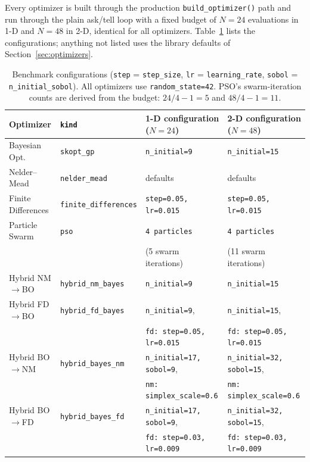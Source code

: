 Every optimizer is built through the production \texttt{build\_optimizer()}
path and run through the plain ask/tell loop with a fixed budget of
$N = 24$ evaluations in 1-D and $N = 48$ in 2-D, identical for all
optimizers.  Table~\ref{tab:bench-config} lists the configurations;
anything not listed uses the library defaults of
Section~\ref{sec:optimizers}.

\begin{table}[htbp]
\centering
\small
\begin{tabular}{@{}llll@{}}
\toprule
Optimizer & \texttt{kind} & 1-D configuration ($N{=}24$) & 2-D configuration ($N{=}48$) \\
\midrule
Bayesian Opt. & \texttt{skopt\_gp} &
  \texttt{n\_initial=9} & \texttt{n\_initial=15} \\
Nelder--Mead & \texttt{nelder\_mead} &
  defaults & defaults \\
Finite Differences & \texttt{finite\_differences} &
  \texttt{step=0.05, lr=0.015} & \texttt{step=0.05, lr=0.015} \\
Particle Swarm & \texttt{pso} &
  \texttt{4 particles} & \texttt{4 particles} \\
 & & (5 swarm iterations) & (11 swarm iterations) \\
Hybrid NM$\to$BO & \texttt{hybrid\_nm\_bayes} &
  \texttt{n\_initial=9} & \texttt{n\_initial=15} \\
Hybrid FD$\to$BO & \texttt{hybrid\_fd\_bayes} &
  \texttt{n\_initial=9}, & \texttt{n\_initial=15}, \\
 & & \texttt{fd: step=0.05, lr=0.015} & \texttt{fd: step=0.05, lr=0.015} \\
Hybrid BO$\to$NM & \texttt{hybrid\_bayes\_nm} &
  \texttt{n\_initial=17, sobol=9}, & \texttt{n\_initial=32, sobol=15}, \\
 & & \texttt{nm: simplex\_scale=0.6} & \texttt{nm: simplex\_scale=0.6} \\
Hybrid BO$\to$FD & \texttt{hybrid\_bayes\_fd} &
  \texttt{n\_initial=17, sobol=9}, & \texttt{n\_initial=32, sobol=15}, \\
 & & \texttt{fd: step=0.03, lr=0.009} & \texttt{fd: step=0.03, lr=0.009} \\
\bottomrule
\end{tabular}
\caption{Benchmark configurations (\texttt{step} = \texttt{step\_size},
\texttt{lr} = \texttt{learning\_rate}, \texttt{sobol} =
\texttt{n\_initial\_sobol}).  All optimizers use
\texttt{random\_state=42}.  PSO's swarm-iteration counts are derived from
the budget: $24/4 - 1 = 5$ and $48/4 - 1 = 11$.}
\label{tab:bench-config}
\end{table}

